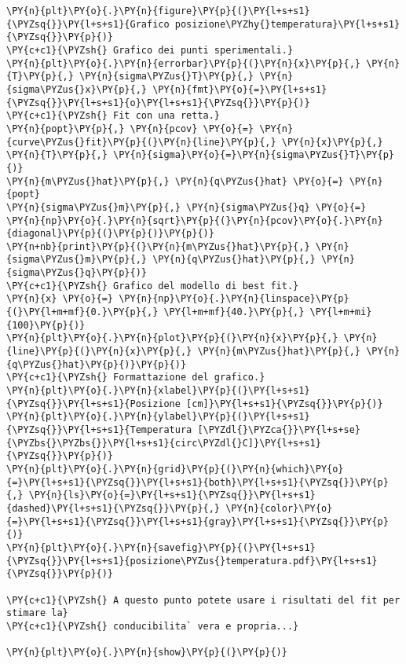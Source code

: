 \begin{Verbatim}[label=\makebox{\href{https://github.com/unipi-physics-labs/lab1-sheets/tree/main/snippy/conducibilita_termica.py}{https://github.com/.../conducibilita\_termica.py}},commandchars=\\\{\}]
\PY{n}{plt}\PY{o}{.}\PY{n}{figure}\PY{p}{(}\PY{l+s+s1}{\PYZsq{}}\PY{l+s+s1}{Grafico posizione\PYZhy{}temperatura}\PY{l+s+s1}{\PYZsq{}}\PY{p}{)}
\PY{c+c1}{\PYZsh{} Grafico dei punti sperimentali.}
\PY{n}{plt}\PY{o}{.}\PY{n}{errorbar}\PY{p}{(}\PY{n}{x}\PY{p}{,} \PY{n}{T}\PY{p}{,} \PY{n}{sigma\PYZus{}T}\PY{p}{,} \PY{n}{sigma\PYZus{}x}\PY{p}{,} \PY{n}{fmt}\PY{o}{=}\PY{l+s+s1}{\PYZsq{}}\PY{l+s+s1}{o}\PY{l+s+s1}{\PYZsq{}}\PY{p}{)}
\PY{c+c1}{\PYZsh{} Fit con una retta.}
\PY{n}{popt}\PY{p}{,} \PY{n}{pcov} \PY{o}{=} \PY{n}{curve\PYZus{}fit}\PY{p}{(}\PY{n}{line}\PY{p}{,} \PY{n}{x}\PY{p}{,} \PY{n}{T}\PY{p}{,} \PY{n}{sigma}\PY{o}{=}\PY{n}{sigma\PYZus{}T}\PY{p}{)}
\PY{n}{m\PYZus{}hat}\PY{p}{,} \PY{n}{q\PYZus{}hat} \PY{o}{=} \PY{n}{popt}
\PY{n}{sigma\PYZus{}m}\PY{p}{,} \PY{n}{sigma\PYZus{}q} \PY{o}{=} \PY{n}{np}\PY{o}{.}\PY{n}{sqrt}\PY{p}{(}\PY{n}{pcov}\PY{o}{.}\PY{n}{diagonal}\PY{p}{(}\PY{p}{)}\PY{p}{)}
\PY{n+nb}{print}\PY{p}{(}\PY{n}{m\PYZus{}hat}\PY{p}{,} \PY{n}{sigma\PYZus{}m}\PY{p}{,} \PY{n}{q\PYZus{}hat}\PY{p}{,} \PY{n}{sigma\PYZus{}q}\PY{p}{)}
\PY{c+c1}{\PYZsh{} Grafico del modello di best fit.}
\PY{n}{x} \PY{o}{=} \PY{n}{np}\PY{o}{.}\PY{n}{linspace}\PY{p}{(}\PY{l+m+mf}{0.}\PY{p}{,} \PY{l+m+mf}{40.}\PY{p}{,} \PY{l+m+mi}{100}\PY{p}{)}
\PY{n}{plt}\PY{o}{.}\PY{n}{plot}\PY{p}{(}\PY{n}{x}\PY{p}{,} \PY{n}{line}\PY{p}{(}\PY{n}{x}\PY{p}{,} \PY{n}{m\PYZus{}hat}\PY{p}{,} \PY{n}{q\PYZus{}hat}\PY{p}{)}\PY{p}{)}
\PY{c+c1}{\PYZsh{} Formattazione del grafico.}
\PY{n}{plt}\PY{o}{.}\PY{n}{xlabel}\PY{p}{(}\PY{l+s+s1}{\PYZsq{}}\PY{l+s+s1}{Posizione [cm]}\PY{l+s+s1}{\PYZsq{}}\PY{p}{)}
\PY{n}{plt}\PY{o}{.}\PY{n}{ylabel}\PY{p}{(}\PY{l+s+s1}{\PYZsq{}}\PY{l+s+s1}{Temperatura [\PYZdl{}\PYZca{}}\PY{l+s+se}{\PYZbs{}\PYZbs{}}\PY{l+s+s1}{circ\PYZdl{}C]}\PY{l+s+s1}{\PYZsq{}}\PY{p}{)}
\PY{n}{plt}\PY{o}{.}\PY{n}{grid}\PY{p}{(}\PY{n}{which}\PY{o}{=}\PY{l+s+s1}{\PYZsq{}}\PY{l+s+s1}{both}\PY{l+s+s1}{\PYZsq{}}\PY{p}{,} \PY{n}{ls}\PY{o}{=}\PY{l+s+s1}{\PYZsq{}}\PY{l+s+s1}{dashed}\PY{l+s+s1}{\PYZsq{}}\PY{p}{,} \PY{n}{color}\PY{o}{=}\PY{l+s+s1}{\PYZsq{}}\PY{l+s+s1}{gray}\PY{l+s+s1}{\PYZsq{}}\PY{p}{)}
\PY{n}{plt}\PY{o}{.}\PY{n}{savefig}\PY{p}{(}\PY{l+s+s1}{\PYZsq{}}\PY{l+s+s1}{posizione\PYZus{}temperatura.pdf}\PY{l+s+s1}{\PYZsq{}}\PY{p}{)}

\PY{c+c1}{\PYZsh{} A questo punto potete usare i risultati del fit per stimare la}
\PY{c+c1}{\PYZsh{} conducibilita` vera e propria...}

\PY{n}{plt}\PY{o}{.}\PY{n}{show}\PY{p}{(}\PY{p}{)}
\end{Verbatim}
